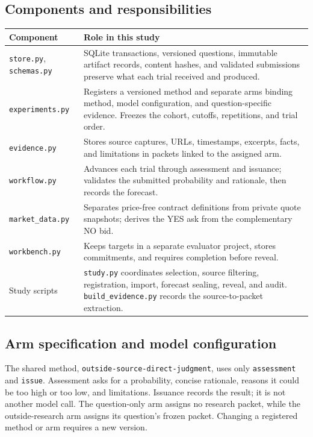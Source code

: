 \documentclass[11pt,letterpaper]{article}
\newcommand{\file}[1]{{\small\nolinkurl{#1}}}
\begin{document}
\subsection{Components and responsibilities}
\small
\renewcommand{\arraystretch}{1.16}
\begin{tabularx}{\linewidth}{@{}p{1.57in}Y@{}}
\toprule
Component & Role in this study\\
\midrule
\file{store.py}, \file{schemas.py} & SQLite transactions, versioned questions,
immutable artifact records, content hashes, and validated submissions preserve
what each trial received and produced.\\
\file{experiments.py} & Registers a versioned method and separate arms binding
method, model configuration, and question-specific evidence. Freezes the cohort,
cutoffs, repetitions, and trial order.\\
\file{evidence.py} & Stores source captures, URLs, timestamps, excerpts, facts,
and limitations in packets linked to the assigned arm.\\
\file{workflow.py} & Advances each trial through assessment and issuance;
validates the submitted probability and rationale, then records the forecast.\\
\file{market_data.py} & Separates price-free contract definitions from private
quote snapshots; derives the YES ask from the complementary NO bid.\\
\file{workbench.py} & Keeps targets in a separate evaluator project, stores
commitments, and requires completion before reveal.\\
Study scripts & \file{study.py} coordinates selection, source filtering,
registration, import, forecast sealing, reveal, and audit.
\file{build_evidence.py} records the source-to-packet extraction.\\
\bottomrule
\end{tabularx}
\normalsize

\subsection{Arm specification and model configuration}
The shared method, \file{outside-source-direct-judgment}, uses only
\file{assessment} and \file{issue}. Assessment asks for a probability, concise
rationale, reasons it could be too high or too low, and limitations. Issuance
records the result; it is not another model call. The question-only arm assigns
no research packet, while the outside-research arm assigns its question's frozen
packet. Changing a registered method or arm requires a new version.
\end{document}
